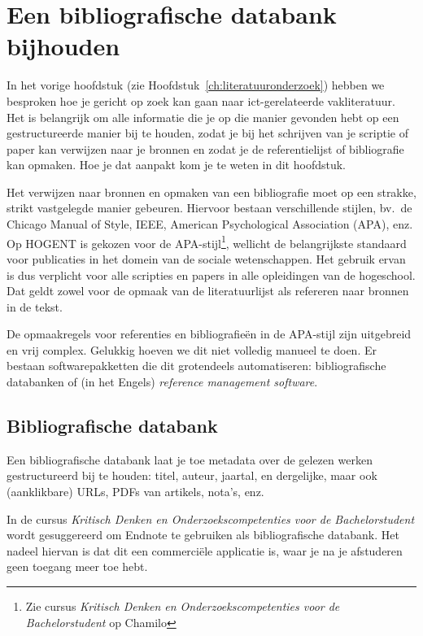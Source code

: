 \chapter{Een bibliografische databank bijhouden}%
\label{ch:bibliografie}


In het vorige hoofdstuk (zie Hoofdstuk~\ref{ch:literatuuronderzoek}) hebben we besproken hoe je gericht op zoek kan gaan naar ict-gerelateerde vakliteratuur. Het is belangrijk om alle informatie die je op die manier gevonden hebt op een gestructureerde manier bij te houden, zodat je bij het schrijven van je scriptie of paper kan verwijzen naar je bronnen en zodat je de referentielijst of bibliografie kan opmaken. Hoe je dat aanpakt kom je te weten in dit hoofdstuk.

Het verwijzen naar bronnen en opmaken van een bibliografie moet op een strakke, strikt vastgelegde manier gebeuren. Hiervoor bestaan verschillende stijlen, bv.\ de Chicago Manual of Style, IEEE, American Psychological Association (APA), enz. Op HOGENT is gekozen voor de APA-stijl\footnote{Zie cursus \emph{Kritisch Denken en Onderzoekscompetenties voor de Bachelorstudent} op Chamilo}, wellicht de belangrijkste standaard voor publicaties in het domein van de sociale wetenschappen. Het gebruik ervan is dus verplicht voor alle scripties en papers in alle opleidingen van de hogeschool. Dat geldt zowel voor de opmaak van de literatuurlijst als refereren naar bronnen in de tekst.

De opmaakregels voor referenties en bibliografieën in de APA-stijl zijn uitgebreid en vrij complex. Gelukkig hoeven we dit niet volledig manueel te doen. Er bestaan softwarepakketten die dit grotendeels automatiseren: bibliografische databanken of (in het Engels) \emph{reference management software}.

\section{Bibliografische databank}%
\label{sec:bibliografische-databank}

Een bibliografische databank laat je toe metadata over de gelezen werken gestructureerd bij te houden: titel, auteur, jaartal, en dergelijke, maar ook (aanklikbare) URLs, PDFs van artikels, nota's, enz.

In de cursus \emph{Kritisch Denken en Onderzoekscompetenties voor de Bachelorstudent} wordt gesuggereerd om Endnote te gebruiken als bibliografische databank. Het nadeel hiervan is dat dit een commerciële applicatie is, waar je na je afstuderen geen toegang meer toe hebt.

